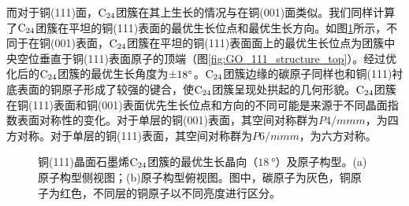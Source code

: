 而对于铜(111)面，$\rm{C_{24}}$团簇在其上生长的情况与在铜(001)面类似。我们同样计算了$\rm{C_{24}}$团簇在平坦的铜(111)表面的最优生长位点和最优生长方向。如图\ref{fig:GO_111_structure}所示，不同于在铜(001)表面，$\rm{C_{24}}$团簇在平坦的铜(111)表面面上的最优生长位点为团簇中央空位垂直于铜(111)表面原子的顶端（图\ref{fig:GO_111_structure_top}）。经过优化后的$\rm{C_{24}}$团簇的最优生长角度为$\SI{\pm 18}{\degree}$。$\rm{C_{24}}$团簇边缘的碳原子同样也和铜(111)衬底表面的铜原子形成了较强的键合，使$\rm{C_{24}}$团簇呈现处拱起的几何形貌。$\rm{C_{24}}$团簇在铜(111)表面和铜(001)表面优先生长位点和方向的不同可能是来源于不同晶面指数表面对称性的变化。对于单层的铜(001)表面，其空间对称群为$P4/mmm$，为四方对称。对于单层的铜(111)表面，其空间对称群为$P6/mmm$，为六方对称。

\begin{figure}[htb]

    \caption{铜(111)晶面石墨烯$\rm{C_{24}}$团簇的最优生长晶向（$\SI{18}{\degree}$）及原子构型。(a)原子构型侧视图；(b)原子构型俯视图。图中，碳原子为灰色，铜原子为红色，不同层的铜原子以不同亮度进行区分。
    }

    \label{fig:GO_111_structure}
\end{figure}

